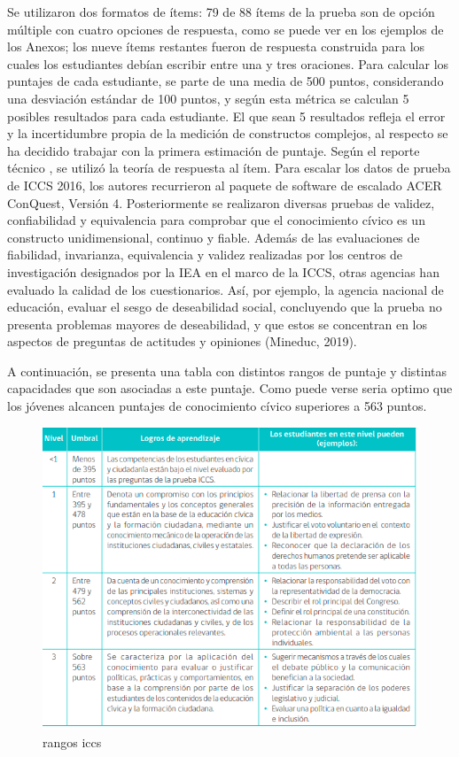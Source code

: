 \documentclass[12pt,twoside]{templates/facsothesis}
\begin{document}
Se utilizaron dos formatos de ítems: 79 de 88 ítems de la prueba son de opción múltiple con cuatro opciones de respuesta, como se puede ver en los ejemplos de los Anexos; los nueve ítems restantes fueron de respuesta construida para los cuales los estudiantes debían escribir entre una y tres oraciones. Para calcular los puntajes de cada estudiante, se parte de una media de 500 puntos, considerando una desviación estándar de 100 puntos, y según esta métrica se calculan 5 posibles resultados para cada estudiante. El que sean 5 resultados refleja el error y la incertidumbre propia de la medición de constructos complejos, al respecto se ha decidido trabajar con la primera estimación de puntaje. Según el reporte técnico \citep{schulz_ICCS_2016}, se utilizó la teoría de respuesta al ítem. Para escalar los datos de prueba de ICCS 2016, los autores recurrieron al paquete de software de escalado ACER ConQuest, Versión 4. Posteriormente se realizaron diversas pruebas de validez, confiabilidad y equivalencia para comprobar que el conocimiento cívico es un constructo unidimensional, continuo y fiable.
Además de las evaluaciones de fiabilidad, invarianza, equivalencia y validez realizadas por los centros de investigación designados por la IEA en el marco de la ICCS, otras agencias han evaluado la calidad de los cuestionarios. Así, por ejemplo, la agencia nacional de educación, evaluar el sesgo de deseabilidad social, concluyendo que la prueba no presenta problemas mayores de deseabilidad, y que estos se concentran en los aspectos de preguntas de actitudes y opiniones (Mineduc, 2019).

A continuación, se presenta una tabla con distintos rangos de puntaje y distintas capacidades que son asociadas a este puntaje. Como puede verse seria optimo que los jóvenes alcancen puntajes de conocimiento cívico superiores a 563 puntos.

\begin{figure}

{\centering \includegraphics[width=0.8\linewidth]{images/puntajesdecorteiccs} 

}

\caption{rangos iccs}\label{fig:unnamed-chunk-3}
\end{figure}
\end{document}
